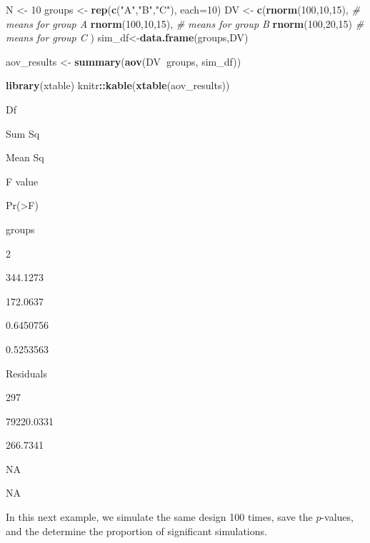 \documentclass[]{book}
\newenvironment{Shaded}{\begin{snugshade}}{\end{snugshade}}
\newcommand{\CommentTok}[1]{\textcolor[rgb]{0.56,0.35,0.01}{\textit{#1}}}
\newcommand{\DataTypeTok}[1]{\textcolor[rgb]{0.13,0.29,0.53}{#1}}
\newcommand{\DecValTok}[1]{\textcolor[rgb]{0.00,0.00,0.81}{#1}}
\newcommand{\KeywordTok}[1]{\textcolor[rgb]{0.13,0.29,0.53}{\textbf{#1}}}
\newcommand{\NormalTok}[1]{#1}
\newcommand{\OperatorTok}[1]{\textcolor[rgb]{0.81,0.36,0.00}{\textbf{#1}}}
\newcommand{\StringTok}[1]{\textcolor[rgb]{0.31,0.60,0.02}{#1}}
\begin{document}
\begin{Shaded}
\begin{Highlighting}[]
\NormalTok{N <-}\StringTok{ }\DecValTok{10}
\NormalTok{groups <-}\StringTok{ }\KeywordTok{rep}\NormalTok{(}\KeywordTok{c}\NormalTok{(}\StringTok{"A"}\NormalTok{,}\StringTok{"B"}\NormalTok{,}\StringTok{"C"}\NormalTok{), }\DataTypeTok{each=}\DecValTok{10}\NormalTok{)}
\NormalTok{DV <-}\StringTok{ }\KeywordTok{c}\NormalTok{(}\KeywordTok{rnorm}\NormalTok{(}\DecValTok{100}\NormalTok{,}\DecValTok{10}\NormalTok{,}\DecValTok{15}\NormalTok{),   }\CommentTok{# means for group A}
        \KeywordTok{rnorm}\NormalTok{(}\DecValTok{100}\NormalTok{,}\DecValTok{10}\NormalTok{,}\DecValTok{15}\NormalTok{),   }\CommentTok{# means for group B}
        \KeywordTok{rnorm}\NormalTok{(}\DecValTok{100}\NormalTok{,}\DecValTok{20}\NormalTok{,}\DecValTok{15}\NormalTok{)    }\CommentTok{# means for group C}
\NormalTok{        )}
\NormalTok{sim_df<-}\KeywordTok{data.frame}\NormalTok{(groups,DV)}

\NormalTok{aov_results <-}\StringTok{ }\KeywordTok{summary}\NormalTok{(}\KeywordTok{aov}\NormalTok{(DV}\OperatorTok{~}\NormalTok{groups, sim_df))}

\KeywordTok{library}\NormalTok{(xtable)}
\NormalTok{knitr}\OperatorTok{::}\KeywordTok{kable}\NormalTok{(}\KeywordTok{xtable}\NormalTok{(aov_results))}
\end{Highlighting}
\end{Shaded}

Df

Sum Sq

Mean Sq

F value

Pr(\textgreater{}F)

groups

2

344.1273

172.0637

0.6450756

0.5253563

Residuals

297

79220.0331

266.7341

NA

NA

In this next example, we simulate the same design 100 times, save the \(p\)-values, and the determine the proportion of significant simulations.
\end{document}
